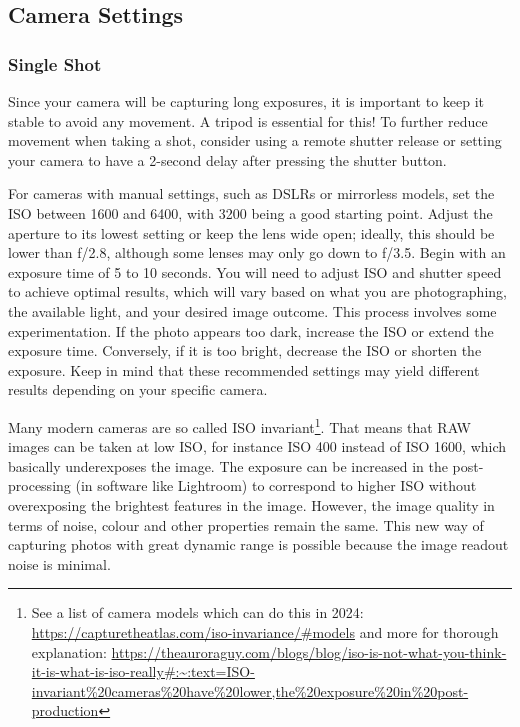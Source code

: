 \documentclass{article}
\begin{document}
\subsection{Camera Settings}
\subsubsection{Single Shot}\label{single-shot}
Since your camera will be capturing long exposures, it is important to keep it stable to avoid any movement. A tripod is essential for this! To further reduce movement when taking a shot, consider using a remote shutter release or setting your camera to have a 2-second delay after pressing the shutter button.

For cameras with manual settings, such as DSLRs or mirrorless models, set the ISO between 1600 and 6400, with 3200 being a good starting point. Adjust the aperture to its lowest setting or keep the lens wide open; ideally, this should be lower than f/2.8, although some lenses may only go down to f/3.5. Begin with an exposure time of 5 to 10 seconds. You will need to adjust ISO and shutter speed to achieve optimal results, which will vary based on what you are photographing, the available light, and your desired image outcome. This process involves some experimentation. If the photo appears too dark, increase the ISO or extend the exposure time. Conversely, if it is too bright, decrease the ISO or shorten the exposure. Keep in mind that these recommended settings may yield different results depending on your specific camera.

Many modern cameras are so called ISO invariant\footnote{See a list of camera models which can do this in 2024: \url{https://capturetheatlas.com/iso-invariance/\#models} and more for thorough explanation: \url{https://theauroraguy.com/blogs/blog/iso-is-not-what-you-think-it-is-what-is-iso-really\#:~:text=ISO-invariant\%20cameras\%20have\%20lower,the\%20exposure\%20in\%20post-production}}. That means that RAW images can be taken at low ISO, for instance ISO 400 instead of ISO 1600, which basically underexposes the image. The exposure can be increased in the post-processing (in software like Lightroom) to correspond to higher ISO without overexposing the brightest features in the image. However, the image quality in terms of noise, colour and other properties remain the same. This new way of capturing photos with great dynamic range is possible because the image readout noise is minimal.
\end{document}
